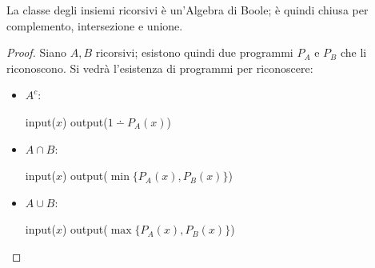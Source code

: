 \begin{theorem}\label{theo:Arr_ric}
    La classe degli insiemi ricorsivi è un'Algebra di Boole; è quindi chiusa per
    complemento, intersezione e unione.
\end{theorem}
\begin{proof}
    Siano $A,B$ ricorsivi; esistono quindi due programmi $P_A$ e $P_B$ che li riconoscono.
    Si vedrà l'esistenza di programmi per riconoscere:
    \begin{itemize}
        \item $A^c$:  \hspace{1em}    
            \begin{minipage}{.35\textwidth}
            \begin{tcolorbox}[
                colback=white,
                sharp corners,
                boxrule=.3mm,
                left=20pt,
                top=0pt,
                bottom=0pt
            ]
            \begin{algorithm}[H]
                input($x$)\;
                output($1\dotminus P_A(x)$)\;
            \end{algorithm}
            \end{tcolorbox}
            \end{minipage}
        \item $A\cap B$:  \hspace{1em}    
            \begin{minipage}{.435\textwidth}
            \begin{tcolorbox}[
                colback=white,
                sharp corners,
                boxrule=.3mm,
                left=20pt,
                top=0pt,
                bottom=0pt
            ]
            \begin{algorithm}[H]
                input($x$)\;
                output($\min{\{P_A(x),P_B(x)\}}$)\;
            \end{algorithm}
            \end{tcolorbox}
            \end{minipage}
        \item $A\cup B$:  \hspace{1em}    
            \begin{minipage}{.435\textwidth}
            \begin{tcolorbox}[
                colback=white,
                sharp corners,
                boxrule=.3mm,
                left=20pt,
                top=0pt,
                bottom=0pt
            ]
            \begin{algorithm}[H]
                input($x$)\;
                output($\max{\{P_A(x),P_B(x)\}}$)\;
            \end{algorithm}
            \end{tcolorbox}
            \end{minipage}
    \end{itemize}
\end{proof}

